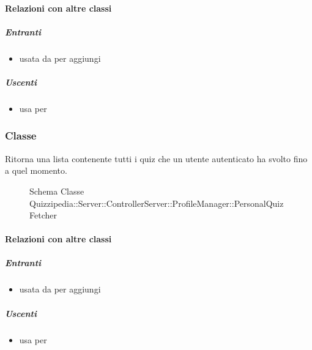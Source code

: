 \paragraph{Relazioni con altre classi}
\subparagraph{Entranti}
\begin{itemize}
\item usata da  per aggiungi
\end{itemize}
\subparagraph{Uscenti}
\begin{itemize}
\item usa  per 
\end{itemize}
\subsubsection{Classe }
Ritorna una lista contenente tutti i quiz che un utente autenticato ha svolto fino a quel momento.
\begin{figure}[H]
\centering
\noindent{}
\caption[Schema Classe PersonalQuizFetcher]{Schema Classe Quizzipedia::Server::ControllerServer::ProfileManager::PersonalQuizFetcher}
\end{figure}
\paragraph{Relazioni con altre classi}
\subparagraph{Entranti}
\begin{itemize}
\item usata da  per aggiungi
\end{itemize}
\subparagraph{Uscenti}
\begin{itemize}
\item usa  per 
\end{itemize}
